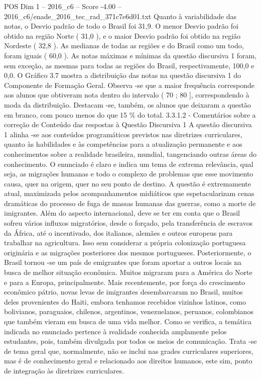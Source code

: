 \begin{textsample}{POS Dim 1 – 2016\_c6 – Score -4.00 – 2016\_c6/enade\_2016\_tec\_rad\_371c7e6d01.txt}
Quanto à variabilidade das notas, o Desvio padrão de todo o Brasil foi 31,9.
O menor Desvio padrão foi obtido na região Norte ( 31,0 ), e o maior Desvio padrão foi obtido na região Nordeste ( 32,8 ).
As medianas de todas as regiões e do Brasil como um todo, foram iguais ( 60,0 ).
As notas máximas e mínimas da questão discursiva 1 foram, sem exceção, as mesmas para todas as regiões do Brasil, respectivamente, 100,0 e 0,0.
O Gráfico 3.7 mostra a distribuição das notas na questão discursiva 1 do Componente de Formação Geral.
Observa -se que a maior frequência corresponde aos alunos que obtiveram nota dentro do intervalo ( 70 ; 80 ], correspondendo à moda da distribuição.
Destacam -se, também, os alunos que deixaram a questão em branco, com pouco menos do que 15 \% do total. 3.3.1.2 - Comentários sobre a correção de Conteúdo das respostas à Questão Discursiva 1 A questão discursiva 1 alinha -se aos conteúdos programáticos previstos nas diretrizes curriculares, quanto às habilidades e às competências para a atualização permanente e aos conhecimentos sobre a realidade brasileira, mundial, tangenciando outras áreas do conhecimento.
O enunciado é claro e indica um tema de extrema relevância, qual seja, as migrações humanas e todo o complexo de problemas que esse movimento causa, quer na origem, quer no seu ponto de destino.
A questão é extremamente atual, maximizada pelos acompanhamentos midiáticos que espetacularizam cenas dramáticas do processo de fuga de massas humanas das guerras, como a morte de imigrantes.
Além do aspecto internacional, deve se ter em conta que o Brasil sofreu vários influxos migratórios, desde o forçado, pela transferência de escravos da África, até o incentivado, dos italianos, alemães e outros europeus para trabalhar na agricultura.
Isso sem considerar a própria colonização portuguesa originária e as migrações posteriores dos mesmos portugueses.
Posteriormente, o Brasil tornou -se um país de emigrantes que foram aportar a outros locais na busca de melhor situação econômica.
Muitos migraram para a América do Norte e para a Europa, principalmente.
Mais recentemente, por força do crescimento econômico pátrio, novas levas de imigrantes desembarcaram no Brasil, muitos deles provenientes do Haiti, embora tenhamos recebidos vizinhos latinos, como bolivianos, paraguaios, chilenos, argentinos, venezuelanos, peruanos, colombianos que também vieram em busca de uma vida melhor.
Como se verifica, a temática indicada no enunciado pertence à realidade conhecida amplamente pelos estudantes, pois, também divulgada por todos os meios de comunicação.
Trata -se de tema geral que, normalmente, não se inclui nas grades curriculares superiores, mas é de conhecimento geral e relacionado aos direitos humanos, este sim, ponto de integração às diretrizes curriculares.

\end{textsample}
